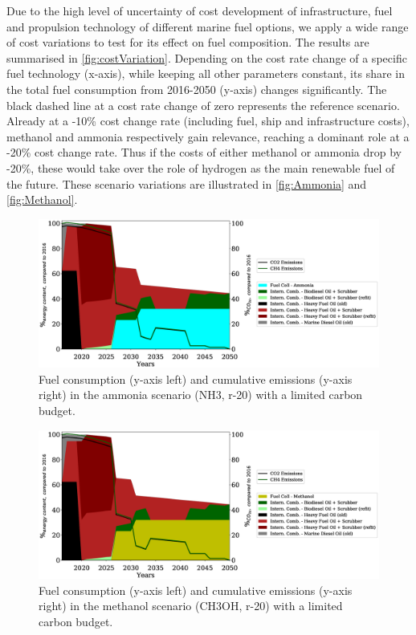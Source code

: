\documentclass[article]{elsarticle}
\begin{document}
Due to the high level of uncertainty of cost development of infrastructure, fuel and propulsion technology of different marine fuel options, we apply a wide range of cost variations to test for its effect on fuel composition. The results are summarised in \autoref{fig:costVariation}. Depending on the cost rate change of a specific fuel technology (x-axis), while keeping all other parameters constant, its share in the total fuel consumption from 2016-2050 (y-axis) changes significantly. The black dashed line at a cost rate change of zero represents the reference scenario. Already at a -10\% cost change rate (including fuel, ship and infrastructure costs), methanol and ammonia respectively gain relevance, reaching a dominant role at a -20\% cost change rate. Thus if the costs of either methanol or ammonia drop by -20\%, these would take over the role of hydrogen as the main renewable fuel of the future. These scenario variations are illustrated in \autoref{fig:Ammonia} and \autoref{fig:Methanol}.

\begin{figure}
    \centering
    \includegraphics[width=\textwidth]{figures/NH3_fuels_emissions.eps}
    \caption{Fuel consumption (y-axis left) and cumulative emissions (y-axis right) in the ammonia scenario (NH3, r-20) with a limited carbon budget.}
    \label{fig:Ammonia}
\end{figure}

\begin{figure}
    \centering
    \includegraphics[width=\textwidth]{figures/CH3OH_fuels_emissions.eps}
    \caption{Fuel consumption (y-axis left) and cumulative emissions (y-axis right) in the methanol scenario (CH3OH, r-20) with a limited carbon budget.}
    \label{fig:Methanol}
\end{figure}
\end{document}
